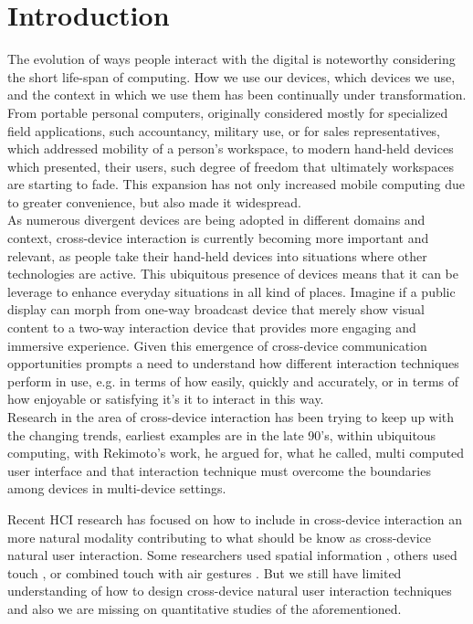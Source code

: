 \section{Introduction} \label{sec:introduction}
The evolution of ways people interact with the digital is noteworthy considering the short life-span of computing. How we use our devices, which devices we use, and the context in which we use them has been continually under transformation. From portable personal computers, originally considered mostly for specialized field applications, such accountancy, military use, or for sales representatives, which addressed mobility of a person's workspace, to modern hand-held devices which presented, their users, such degree of freedom that ultimately workspaces are starting to fade. This expansion has not only increased mobile computing due to greater convenience, but also made it widespread.\cite{Francis:1997} \\

As numerous divergent devices are being adopted in different domains and context, cross-device interaction is currently becoming more important and relevant, as people take their hand-held devices into situations where other technologies are active. This ubiquitous presence of devices means that it can be leverage to enhance everyday situations in all kind of places. Imagine if a public display can morph from one-way broadcast device that merely show visual content to a two-way interaction device that provides more engaging and immersive experience. Given this emergence of cross-device communication opportunities prompts a need to understand how different interaction techniques perform in use, e.g. in terms of how easily, quickly and accurately, or in terms of how enjoyable or satisfying it's it to interact in this way. \\

Research in the area of cross-device interaction has been trying to keep up with the changing trends, earliest examples are in the late 90's, within ubiquitous computing, with Rekimoto's work,  he argued for, what he called, multi computed user interface and that interaction technique must overcome the boundaries among devices in multi-device settings\cite{Rekimoto:1998}.

Recent HCI research has focused on how to include in cross-device interaction an more natural modality contributing to what should be know as cross-device natural user interaction.  Some researchers used spatial information \cite{Marquardt:2011, Marquardt:2012}, others used touch \cite{Seifert:2012}, or combined touch with air gestures \cite{Bragdon:2011} . But we still have limited understanding of how to design cross-device natural user interaction techniques and also we are missing on quantitative studies of the aforementioned.\\

